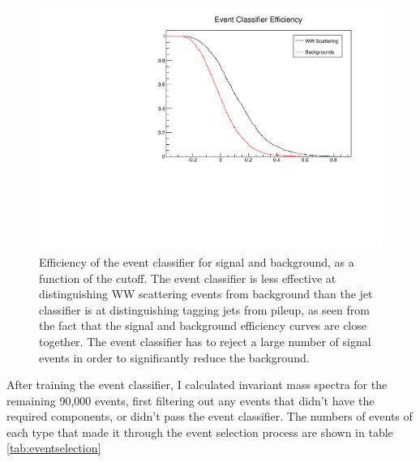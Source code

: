 \documentclass[10pt]{ucscthesisbs}
\begin{document}
\begin{figure}
\includegraphics[height=8cm]{images/EventClassifierEff}
\caption{Efficiency of the event classifier for signal and background, as a function of the cutoff. The event classifier is less effective at distinguishing WW scattering events from background than the jet classifier is at distinguishing tagging jets from pileup, as seen from the fact that the signal and background efficiency curves are close together. The event classifier has to reject a large number of signal events in order to significantly reduce the background.}
\label{fig:eventldeff}
\end{figure}
After training the event classifier, I calculated invariant mass spectra for the remaining 90,000 events, first filtering out any events that didn't have the required components, or didn't pass the event classifier. The numbers of events of each type that made it through the event selection process are shown in table \ref{tab:eventselection}

\begin{table}[]
\centering
{}
\caption{The number of events (out of 90,000 starting events) that make it through each step of the event classification.}
\label{tab:eventselection}
\end{table}
\end{document}

